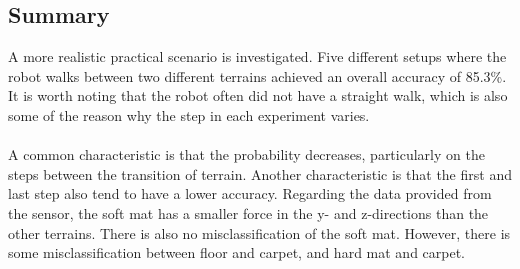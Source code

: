\documentclass[USenglish]{ifimaster}  %
\begin{document}
	\begin{table}[h]
		\centering
		\caption[Results of transistion from soft mat to carpet]{Estimated probability of each terrain per step walking from soft mat to carpet.Values are marked green to represent correct predictions. For incorrect predictions, the actual value is marked yellow while the predicted value is marked red.}
		\label{tab:softcarpet}
	\end{table}
	\FloatBarrier
\newpage

\subsection{Summary}
A more realistic practical scenario is investigated. Five different setups where the robot walks between two different terrains achieved an overall accuracy of 85.3\%. It is worth noting that the robot often did not have a straight walk, which is also some of the reason why the step in each experiment varies. 
\\
\\
A common characteristic is that the probability decreases, particularly on the steps between the transition of terrain. Another characteristic is that the first and last step also tend to have a lower accuracy. Regarding the data provided from the sensor, the soft mat has a smaller force in the y- and z-directions than the other terrains. There is also no misclassification of the soft mat. However, there is some misclassification between floor and carpet, and hard mat and carpet.
\end{document}
